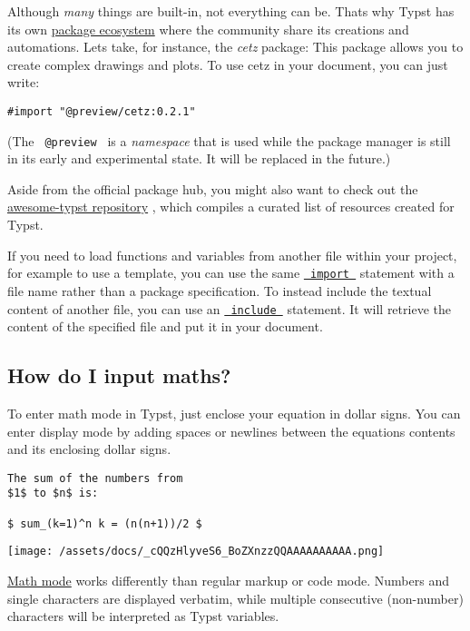 Although \emph{many} things are built-in, not everything can be.
That\textquotesingle s why Typst has its own
\href{https://typst.app/universe/}{package ecosystem} where the
community share its creations and automations. Let\textquotesingle s
take, for instance, the \emph{cetz} package: This package allows you to
create complex drawings and plots. To use cetz in your document, you can
just write:

\begin{verbatim}
#import "@preview/cetz:0.2.1"
\end{verbatim}

(The \texttt{\ @preview\ } is a \emph{namespace} that is used while the
package manager is still in its early and experimental state. It will be
replaced in the future.)

Aside from the official package hub, you might also want to check out
the \href{https://github.com/qjcg/awesome-typst}{awesome-typst
repository} , which compiles a curated list of resources created for
Typst.

If you need to load functions and variables from another file within
your project, for example to use a template, you can use the same
\href{/docs/reference/scripting/\#modules}{\texttt{\ import\ }}
statement with a file name rather than a package specification. To
instead include the textual content of another file, you can use an
\href{/docs/reference/scripting/\#modules}{\texttt{\ include\ }}
statement. It will retrieve the content of the specified file and put it
in your document.

\subsection{How do I input maths?}\label{maths}

To enter math mode in Typst, just enclose your equation in dollar signs.
You can enter display mode by adding spaces or newlines between the
equation\textquotesingle s contents and its enclosing dollar signs.

\begin{verbatim}
The sum of the numbers from
$1$ to $n$ is:

$ sum_(k=1)^n k = (n(n+1))/2 $
\end{verbatim}

\texttt{[image: /assets/docs/\_cQQzHlyveS6\_BoZXnzzQQAAAAAAAAAA.png]}

\href{/docs/reference/math/}{Math mode} works differently than regular
markup or code mode. Numbers and single characters are displayed
verbatim, while multiple consecutive (non-number) characters will be
interpreted as Typst variables.

